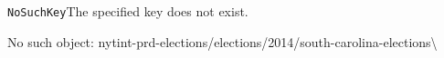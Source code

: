 \texttt{NoSuchKey}The specified key does not exist.

No such object:
nytint-prd-elections/elections/2014/south-carolina-elections\textbackslash{}

